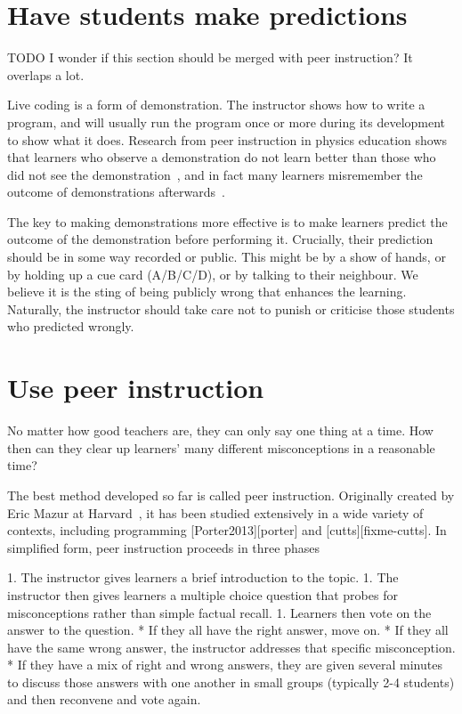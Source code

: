 \documentclass{article}
\begin{document}
\section{Have students make predictions}

TODO I wonder if this section should be merged with peer instruction?  It overlaps a lot.

Live coding is a form of demonstration.  The instructor shows how to write a program, and will usually run the program once or more during its development to show what it does.  Research from peer instruction in physics education shows that learners who observe a demonstration do not learn better than those who did not see the demonstration~\citep{crouch-demo}, and in fact many learners misremember the outcome of demonstrations afterwards~\citep{miller-demo}.

The key to making demonstrations more effective is to make learners predict the outcome of the demonstration before performing it.  Crucially, their prediction should be in some way recorded or public.  This might be by a show of hands, or by holding up a cue card (A/B/C/D), or by talking to their neighbour.  We believe it is the sting of being publicly wrong that enhances the learning.  Naturally, the instructor should take care not to punish or criticise those students who predicted wrongly.

\section{Use peer instruction}

No matter how good teachers are,
they can only say one thing at a time.
How then can they clear up learners' many different misconceptions
in a reasonable time?

The best method developed so far is called peer instruction.
Originally created by Eric Mazur at Harvard~\citep{mazur-peer-instruction},
it has been studied extensively in a wide variety of contexts,
including programming [Porter2013][porter] and [cutts][fixme-cutts].
In simplified form,
peer instruction proceeds in three phases

1. The instructor gives learners a brief introduction to the topic.
1. The instructor then gives learners a multiple choice question
   that probes for misconceptions rather than simple factual recall.
1. Learners then vote on the answer to the question.
   * If they all have the right answer, move on.
   * If they all have the same wrong answer,
     the instructor addresses that specific misconception.
   * If they have a mix of right and wrong answers,
     they are given several minutes to discuss those answers with one another
     in small groups (typically 2-4 students)
     and then reconvene and vote again.
\end{document}

